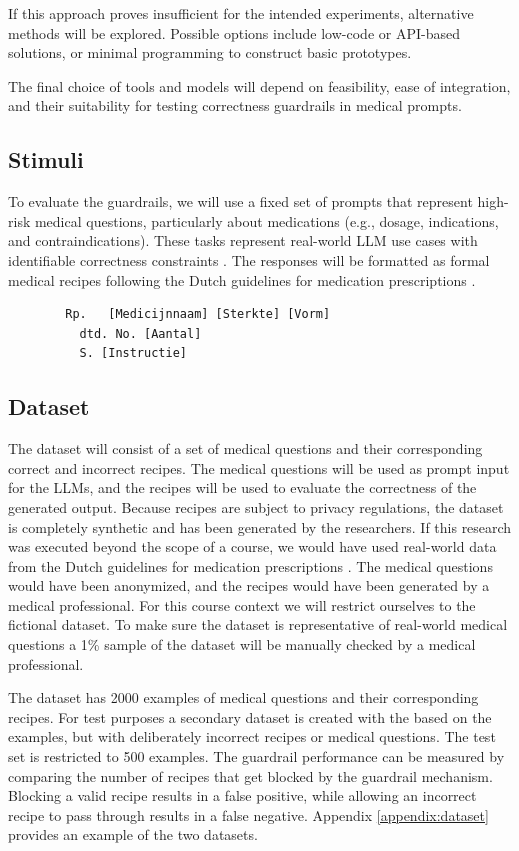 If this approach proves insufficient for the intended experiments, alternative methods will be explored. Possible options include low-code or API-based solutions, or minimal programming to construct basic prototypes.

The final choice of tools and models will depend on feasibility, ease of integration, and their suitability for testing correctness guardrails in medical prompts.

\subsection{Stimuli}

To evaluate the guardrails, we will use a fixed set of prompts that represent high-risk medical questions, particularly about medications (e.g., dosage, indications, and contraindications).
These tasks represent real-world LLM use cases with identifiable correctness constraints \citep{pais2024medication}.
The responses will be formatted as formal medical recipes following the Dutch guidelines for medication prescriptions \citep{farmacotherapeutischkompas}.
\begin{verbatim}
        Rp.   [Medicijnnaam] [Sterkte] [Vorm]
          dtd. No. [Aantal]
          S. [Instructie]
\end{verbatim}

\subsection{Dataset}

The dataset will consist of a set of medical questions and their corresponding correct and incorrect recipes.
The medical questions will be used as prompt input for the LLMs, and the recipes will be used to evaluate the correctness of the generated output.
Because recipes are subject to privacy regulations, the dataset is completely synthetic and has been generated by the researchers.
If this research was executed beyond the scope of a course, we would have used real-world data from the Dutch guidelines for medication prescriptions \citep{farmacotherapeutischkompas}.
The medical questions would have been anonymized, and the recipes would have been generated by a medical professional.
For this course context we will restrict ourselves to the fictional dataset.
To make sure the dataset is representative of real-world medical questions a 1\% sample of the dataset will be manually checked by a medical professional.

The dataset has 2000 examples of medical questions and their corresponding recipes.
For test purposes a secondary dataset is created with the based on the examples, but with deliberately incorrect recipes or medical questions.
The test set is restricted to 500 examples.
The guardrail performance can be measured by comparing the number of recipes that get blocked by the guardrail mechanism.
Blocking a valid recipe results in a false positive, while allowing an incorrect recipe to pass through results in a false negative.
Appendix \ref{appendix:dataset} provides an example of the two datasets.

